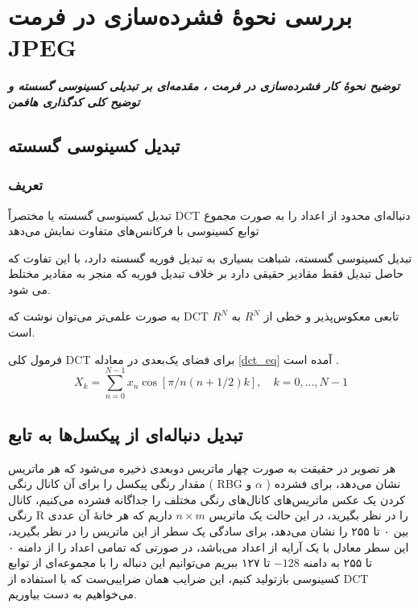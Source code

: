 \chapter{بررسی نحوهٔ فشرده‌سازی در فرمت JPEG}
\noindent
\textbf{
	\textit{
        توضیح نحوهٔ کار فشرده‌سازی در فرمت ، 
        مقدمه‌ای بر تبدیلی کسینوسی گسسته و 
        توضیح کلی کدگذاری هافمن
	}
}
\pagebreak

\section{تبدیل کسینوسی گسسته}

\subsection{
تعریف 
}

تبدیل کسینوسی گسسته 
یا مختصراً
 DCT دنباله‌ای محدود از اعداد را به‌ صورت مجموع توابع کسینوسی با فرکانس‌های متفاوت نمایش می‌دهد

 
 تبدیل کسینوسی گسسته، شباهت بسیاری به تبدیل فوریه گسسته دارد، با این تفاوت که حاصل تبدیل فقط مقادیر حقیقی دارد بر خلاف تبدیل فوریه که منجر به مقادیر مختلط می شود.

 به صورت علمی‌تر می‌توان نوشت که 
 DCT 
 تابعی معکوس‌پذیر و خطی از 
 $R^N$ 
 به 
 $R^N$
 است.

 فرمول کلی DCT 
 برای فضای یک‌بعدی در معادله
 \ref{dct_eq} آمده
 است
\cite{dct}.
 \begin{equation}
 X_k = \sum_{n = 0}^{N - 1} x_n \cos [\pi / n  (n + 1/2)k]
 , \quad k = 0, ..., N - 1
 \label{dct_eq}
 \end{equation}

 \section{تبدیل دنباله‌ای از پیکسل‌ها به تابع}
هر تصویر در حقیقت به صورت چهار ماتریس دوبعدی ذخیره می‌شود که هر ماتریس مقدار رنگی پیکسل را برای آن کانال رنگی
(
RBG و $\alpha$
)
نشان می‌دهد، برای فشرده کردن یک عکس ماتریس‌های کانال‌های رنگی مختلف را جداگانه فشرده می‌کنیم، کانال رنگی R 
را در نظر بگیرید، در این حالت یک ماتریس 
$n \times m$ 
داریم که هر خانهٔ آن عددی بین ۰ تا ۲۵۵ را نشان می‌دهد، برای سادگی یک سطر از این ماتریس را در نظر بگیرید، این سطر معادل با یک 
آرایه از اعداد می‌باشد، در صورتی که تمامی اعداد را از دامنه ۰ تا ۲۵۵ به دامنه
$ -128 $ تا ۱۲۷ ببریم می‌توانیم این دنباله را با مجموعه‌ای از 
توابع کسینوسی بازتولید کنیم، این ضرایب همان ضرایبی‌ست که با استفاده از DCT 
می‌خواهیم به دست بیاوریم.

